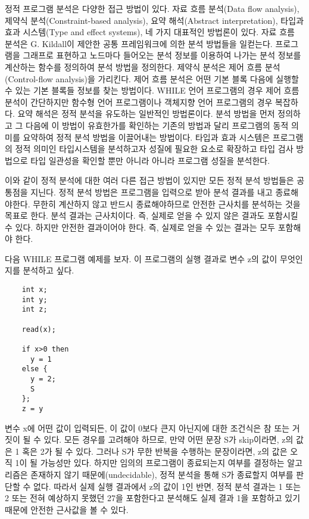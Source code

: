 \documentclass[a4paper]{book}
\begin{document}
정적 프로그램 분석은 다양한 접근 방법이 있다. 자료 흐름 분석(Data flow
analysis), 제약식 분석(Constraint-based analysis), 요약 해석(Abstract
interpretation), 타입과 효과 시스템(Type and effect systems), 네 가지
대표적인 방법론이 있다.
%
자료 흐름 분석은 G. Kildall이 제안한 공통
프레임워크\cite{kildall1973}에 의한 분석 방법들을 일컫는다. 프로그램을
그래프로 표현하고 노드마다 들어오는 분석 정보를 이용하여 나가는 분석
정보를 계산하는 함수를 정의하여 분석 방법을 정의한다.
%
제약식 분석은 제어 흐름 분석(Control-flow analysis)을 가리킨다. 제어
흐름 분석은 어떤 기본 블록 다음에 실행할 수 있는 기본 블록들 정보를
찾는 방법이다. WHILE 언어 프로그램의 경우 제어 흐름 분석이 간단하지만
함수형 언어 프로그램이나 객체지향 언어 프로그램의 경우 복잡하다.
%
요약 해석은 정적 분석을 유도하는 일반적인 방법론이다. 분석 방법을 먼저
정의하고 그 다음에 이 방법이 유효한가를 확인하는 기존의 방법과 달리
프로그램의 동적 의미를 요약하여 정적 분석 방법을 이끌어내는 방법이다.
%
타입과 효과 시스템은 프로그램의 정적 의미인 타입시스템을 분석하고자
성질에 필요한 요소로 확장하고 타입 검사 방법으로 타입 일관성을 확인할
뿐만 아니라 아니라 프로그램 성질을 분석한다.

이와 같이 정적 분석에 대한 여러 다른 접근 방법이 있지만 모든 정적 분석
방법들은 공통점을 지닌다. 정적 분석 방법은 프로그램을 입력으로 받아
분석 결과를 내고 종료해야한다. 무한히 계산하지 않고 반드시
종료해야하므로 안전한 근사치를 분석하는 것을 목표로 한다.  분석 결과는
근사치이다. 즉, 실제로 얻을 수 있지 않은 결과도 포함시킬 수
있다. 하지만 안전한 결과이어야 한다. 즉, 실제로 얻을 수 있는 결과는
모두 포함해야 한다.

다음 WHILE 프로그램 예제를 보자. 이 프로그램의 실행 결과로 변수 z의
값이 무엇인지를 분석하고 싶다. 

\begin{center}
\begin{minipage}[h]{.7\textwidth}
  \begin{lstlisting}
    int x;
    int y;
    int z;
    
    read(x);
    
    if x>0 then
      y = 1
    else {
      y = 2;
      S
    };
    z = y
  \end{lstlisting}
\end{minipage}
\end{center}

변수 x에 어떤 값이 입력되든, 이 값이 0보다 큰지 아닌지에 대한
조건식은 참 또는 거짓이 될 수 있다.  모든 경우를 고려해야 하므로,
만약 어떤 문장 S가 skip이라면, z의 값은 1 혹은 2가 될 수 있다.
%
그러나 S가 무한 반복을 수행하는 문장이라면, z의 값은 오직 1이 될
가능성만 있다.
%
하지만 임의의 프로그램이 종료되는지 여부를 결정하는 알고리즘은 존재하지
않기 때문에(undecidable), 정적 분석을 통해 S가 종료할지 여부를 판단할 수 없다. 
%
따라서 실제 실행 결과에서 z의 값이 1인 반면, 정적 분석 결과는 1 또는 2
또는 전혀 예상하지 못했던 27을 포함한다고 분석해도 실제 결과 1을
포함하고 있기 때문에 안전한 근사값을 볼 수 있다.
\end{document}
